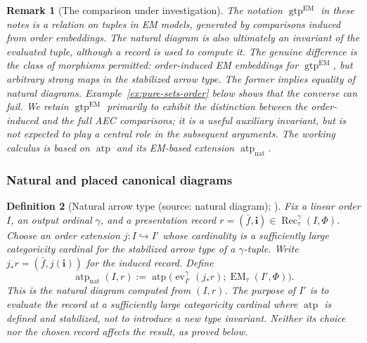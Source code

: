 \documentclass[11pt]{article}
\newcommand{\atp}{\operatorname{atp}}
\newcommand{\natatp}{\operatorname{atp}_{\mathrm{nat}}}
\newcommand{\gtp}{\operatorname{gtp}}
\newcommand{\Rec}{\operatorname{Rec}}
\newcommand{\EM}{\operatorname{EM}_{\tau}}
\newcommand{\bi}{\mathbf{i}}
\theoremstyle{plain}
\newtheorem{definition}{Definition}[section]
\newtheorem{remark}[definition]{Remark}
\begin{document}
\begin{remark}[The comparison under investigation]
The notation $\gtp^{\mathrm{EM}}$ in these notes
is a relation on \emph{tuples in EM models}, generated
by comparisons induced from order embeddings.
The natural diagram is also ultimately an invariant
of the evaluated tuple, although a record is used
to compute it. The genuine difference is the
\emph{class of morphisms permitted}: order-induced
EM embeddings for $\gtp^{\mathrm{EM}}$, but
arbitrary strong maps in the stabilized arrow type.
The former implies equality of natural diagrams.
Example~\ref{ex:pure-sets-order} below shows that
the converse can fail. We retain $\gtp^{\mathrm{EM}}$
primarily to exhibit the distinction between the
order-induced and the full AEC comparisons;
it is a useful auxiliary invariant, but is not
expected to play a central role in the subsequent
arguments. The working calculus is based on
$\atp$ and its EM-based extension $\natatp$.
\end{remark}

\subsubsection*{Natural and placed canonical diagrams}
\begin{definition}[Natural arrow type (source: natural diagram); {\cite[Definition 4.4]{oai-ecc}}]
\label{def:natural-diagram}
Fix a linear order $I$, an output ordinal $\gamma$,
and a presentation record
$r=(\bar f,\bi)\in\Rec_\tau^\gamma(I,\Phi)$.
Choose an order extension $j:I\hookrightarrow I'$
whose cardinality is a sufficiently large
categoricity cardinal for the stabilized arrow
type of a $\gamma$-tuple. Write
$j_*r=(\bar f,j(\bi))$ for the induced record.
Define
\[
\natatp(I,r)
:=
\atp\bigl(\operatorname{ev}_{I'}^\gamma(j_*r);
          \EM(I',\Phi)\bigr).
\]
This is the \emph{natural diagram computed from
$(I,r)$}. The purpose of $I'$ is to evaluate the
record at a sufficiently large categoricity cardinal
where $\atp$ is defined and stabilized, not to
introduce a new type invariant. Neither its choice
nor the chosen record affects the result, as proved below.
\end{definition}
\end{document}
